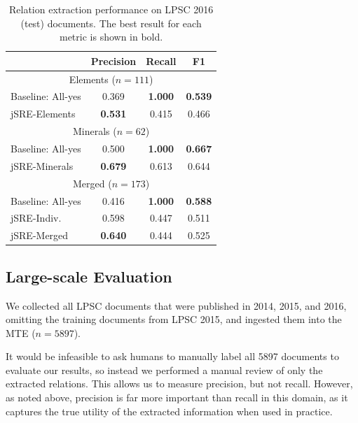 \documentclass[letterpaper]{article} %
\begin{document}

\begin{table}
\caption{Relation extraction performance on LPSC 2016 (test) documents. 
The best result for each metric is shown in bold.}
\label{tab:re}
\begin{center}
\begin{tabular}{l|ccc}
 & Precision & Recall & F1 \\ \hline
\multicolumn{4}{c}{Elements ($n=111$)} \\
Baseline: All-yes & 0.369 & {\bf 1.000} & {\bf 0.539} \\ 
jSRE-Elements & {\bf 0.531} & 0.415 & 0.466 \\ \hline
\multicolumn{4}{c}{Minerals ($n=62$)} \\
Baseline: All-yes & 0.500 & {\bf 1.000} & {\bf 0.667} \\ 
jSRE-Minerals & {\bf 0.679} & 0.613 & 0.644 \\ \hline 
\multicolumn{4}{c}{Merged ($n=173$)} \\
Baseline: All-yes & 0.416 & {\bf 1.000} & {\bf 0.588} \\ 
jSRE-Indiv.  & 0.598 & 0.447 & 0.511 \\
jSRE-Merged  & {\bf 0.640} & 0.444 & 0.525 \\ \hline
\end{tabular}
\end{center}
\end{table}


\subsection{Large-scale Evaluation}

We collected all LPSC documents that were published in 2014, 2015, and
2016, omitting the training documents from LPSC 2015, and ingested
them into the MTE ($n=5897$).  


It would be infeasible to ask humans to manually label all 5897
documents to evaluate our results, so instead we performed a manual
review of only the extracted relations.  This allows us to measure
precision, but not recall.  However, as noted above, precision is far more
important than recall in this domain, as it captures the true utility
of the extracted information when used in practice.
\end{document}
